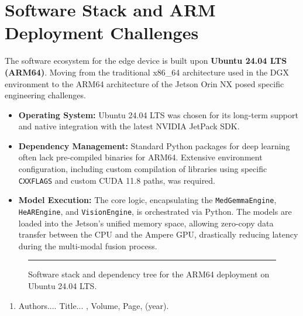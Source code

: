 \documentclass[BTech]{iitmdiss}
\begin{document}
\section{Software Stack and ARM Deployment Challenges}
The software ecosystem for the edge device is built upon \textbf{Ubuntu 24.04 LTS (ARM64)}. Moving from the traditional x86\_64 architecture used in the DGX environment to the ARM64 architecture of the Jetson Orin NX posed specific engineering challenges. 

\begin{itemize}
    \item \textbf{Operating System:} Ubuntu 24.04 LTS was chosen for its long-term support and native integration with the latest NVIDIA JetPack SDK.
    \item \textbf{Dependency Management:} Standard Python packages for deep learning often lack pre-compiled binaries for ARM64. Extensive environment configuration, including custom compilation of libraries using specific \texttt{CXXFLAGS} and custom CUDA 11.8 paths, was required.
    \item \textbf{Model Execution:} The core logic, encapsulating the \texttt{MedGemmaEngine}, \texttt{HeAREngine}, and \texttt{VisionEngine}, is orchestrated via Python. The models are loaded into the Jetson's unified memory space, allowing zero-copy data transfer between the CPU and the Ampere GPU, drastically reducing latency during the multi-modal fusion process.
\end{itemize}

\begin{figure}[htbp]
    \centering
    \rule{0.8\textwidth}{6cm} %
    \caption{Software stack and dependency tree for the ARM64 deployment on Ubuntu 24.04 LTS.}
    \label{fig:software_stack}
\end{figure}

\begin{singlespace}
  \nocite{*}
  
\end{singlespace}



\listofpapers

\begin{enumerate}  
\item Authors....  \newblock
 Title...
  , Volume,
  Page, (year).
\end{enumerate}  
\end{document}
